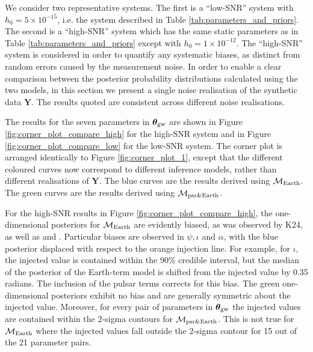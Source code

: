 \documentclass[fleqn,usenatbib,useAMS]{mnras}
\begin{document}
We consider two representative systems. The first is a ``low-SNR'' system with $h_0 = 5 \times 10^{-15}$, i.e. the system described in Table \ref{tab:parameters_and_priors}. The second is a ``high-SNR'' system which has the same static parameters as in Table \ref{tab:parameters_and_priors} except with $h_0 = 1 \times 10^{-12}$. The ``high-SNR'' system is considered in order to quantify any systematic biases, as distinct from random errors caused by the measurement noise. In order to enable a clear comparison between the posterior probability distributions calculated using the two models, in this section we present a single noise realisation of the synthetic data $\boldsymbol{Y}$. The results quoted are consistent across different noise realisations. \newline 


The results for the seven parameters in $\boldsymbol{\theta}_{\rm gw}$ are shown in Figure \ref{fig:corner_plot_compare_high} for the high-SNR system and in Figure \ref{fig:corner_plot_compare_low} for the low-SNR system. The corner plot is arranged identically to Figure \ref{fig:corner_plot_1}, except that the different coloured curves now correspond to different inference models, rather than different realisations of $\boldsymbol{Y}$. The blue curves are the results derived using $\mathcal{M}_{\rm Earth}$. The green curves are the results derived using $\mathcal{M}_{\rm psr \& Earth}$. \newline 
		
For the high-SNR results in Figure \ref{fig:corner_plot_compare_high}, the one-dimensional posteriors for $\mathcal{M}_{\rm Earth}$ are evidently biased, as was observed by K24, as well as \cite{Zhupulsarterms} and \cite{Chen2022}. Particular biases are observed in $\psi, \iota $ and $\alpha$, with the blue posterior displaced with respect to the orange injection line. For example, for $\iota$, the injected value is contained within the 90\% credible interval, but the median of the posterior of the Earth-term model is shifted from the injected value by 0.35 radians. The inclusion of the pulsar terms corrects for this bias. The green one-dimensional posteriors exhibit no bias and are generally symmetric about the injected value. Moreover, for every pair of parameters in ${\boldsymbol{\theta}}_{\rm gw}$ the injected values are contained within the 2-sigma contours for $\mathcal{M}_{\rm psr \& Earth}$. This is not true for $\mathcal{M}_{\rm Earth}$ where the injected values fall outside the 2-sigma contour for 15 out of the 21 parameter pairs.\newline 
\end{document}
